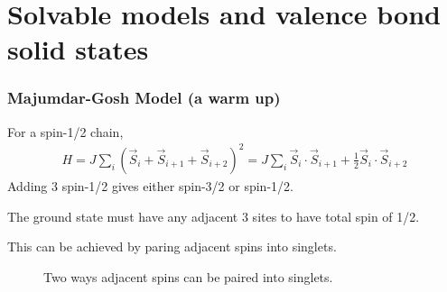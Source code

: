 \documentclass{beamer}
\begin{document}
\section{Solvable models and valence bond solid states}
\begin{frame}
    \frametitle{Majumdar-Gosh Model (a warm up)}
    For a spin-1/2 chain,
    \begin{align*}
        H = J \sum_ i (\vec{S}_{i} + \vec{S}_{i+1}  + \vec{S}_{i+2})^2 = J\sum_ i \vec{S}_{i} \cdot \vec{S}_{i+1}  +\frac{1}{2} \vec{S}_{i} \cdot \vec{S}_{i+2} 
    \end{align*}
    \pause 
    Adding 3 spin-1/2 gives either spin-3/2 or spin-1/2. 
    \pause 
    
    The ground state must have any adjacent 3 sites to have total spin of 1/2. 
    \pause 

    This can be achieved by paring adjacent spins into singlets. 
    \begin{figure}[h]
        \centering
         \hfill
        \caption{Two ways adjacent spins can be paired into singlets.}
        \label{half_vbs}
    \end{figure}
\end{frame}
\end{document}
